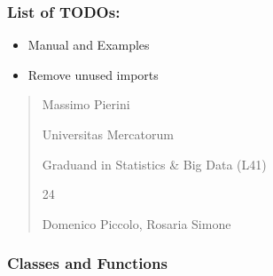 \documentclass[letterpaper,10pt,english]{sphinxmanual}
\begin{document}
\subsubsection{List of TODOs:}
\label{\detokenize{cubmods:id98}}\begin{itemize}
\item {} 
\sphinxAtStartPar
Manual and Examples

\item {} 
\sphinxAtStartPar
Remove unused imports

\end{itemize}
\begin{quote}\begin{description}
\sphinxAtStartPar
Massimo Pierini

\sphinxAtStartPar
Universitas Mercatorum

\sphinxAtStartPar
Graduand in Statistics \& Big Data (L41)

\sphinxhyphen{}24

\sphinxAtStartPar
Domenico Piccolo, Rosaria Simone

\sphinxAtStartPar
{}

\end{description}\end{quote}


\subsubsection{Classes and Functions}
\label{\detokenize{cubmods:id99}}
\end{document}
